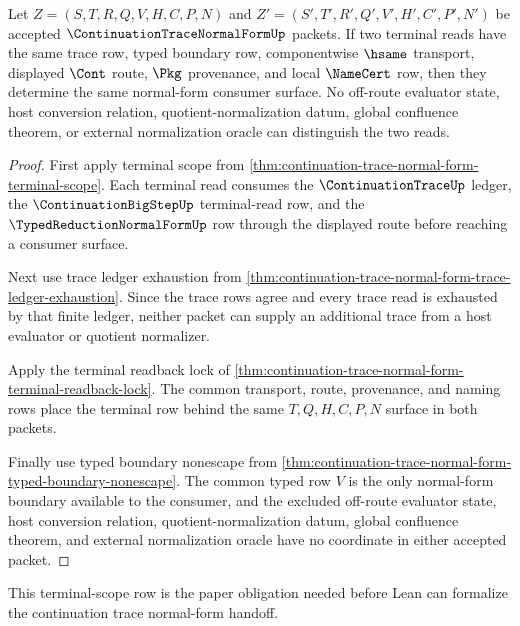 \begin{theorem}
\label{thm:continuation-trace-normal-form-terminal-route-determinacy}
Let $Z=(S,T,R,Q,V,H,C,P,N)$ and $Z'=(S',T',R',Q',V',H',C',P',N')$ be accepted $\ContinuationTraceNormalFormUp$ packets. If two terminal reads have the same trace row, typed boundary row, componentwise $\hsame$ transport, displayed $\Cont$ route, $\Pkg$ provenance, and local $\NameCert$ row, then they determine the same normal-form consumer surface. No off-route evaluator state, host conversion relation, quotient-normalization datum, global confluence theorem, or external normalization oracle can distinguish the two reads.
\end{theorem}
\begin{proof}
First apply terminal scope from \autoref{thm:continuation-trace-normal-form-terminal-scope}. Each terminal read consumes the $\ContinuationTraceUp$ ledger, the $\ContinuationBigStepUp$ terminal-read row, and the $\TypedReductionNormalFormUp$ row through the displayed route before reaching a consumer surface.

Next use trace ledger exhaustion from \autoref{thm:continuation-trace-normal-form-trace-ledger-exhaustion}. Since the trace rows agree and every trace read is exhausted by that finite ledger, neither packet can supply an additional trace from a host evaluator or quotient normalizer.

Apply the terminal readback lock of \autoref{thm:continuation-trace-normal-form-terminal-readback-lock}. The common transport, route, provenance, and naming rows place the terminal row behind the same $T,Q,H,C,P,N$ surface in both packets.

Finally use typed boundary nonescape from \autoref{thm:continuation-trace-normal-form-typed-boundary-nonescape}. The common typed row $V$ is the only normal-form boundary available to the consumer, and the excluded off-route evaluator state, host conversion relation, quotient-normalization datum, global confluence theorem, and external normalization oracle have no coordinate in either accepted packet.
\end{proof}

This terminal-scope row is the paper obligation needed before Lean can formalize the continuation trace normal-form handoff.

